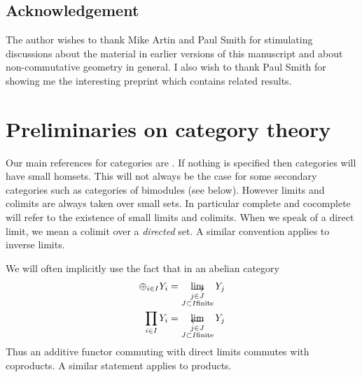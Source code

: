 \documentclass{amsproc}
\let\oldtext\text
\def\text#1{\oldtext{\upshape #1}}
\let\invlim\projlim
\theoremstyle{definition}
\theoremstyle{remark}
\def\dirlim{\mathop{\vtop{\baselineskip -100pt\lineskip -1pt\lineskiplimit 0pt
\setbox0\hbox{\upshape lim}\copy0\hbox to \wd0{\rightarrowfill}}}\limits}
\def\invlim{\mathop{\vtop{\baselineskip -100pt\lineskip -1pt\lineskiplimit 0pt
\setbox0\hbox{\upshape lim}\copy0\hbox to \wd0{\leftarrowfill}}}\limits}
\numberwithin{equation}{section}
\numberwithin{table}{section}
\numberwithin{figure}{section}
\begin{document}
\subsection{Acknowledgement}
The author wishes to thank Mike Artin and Paul Smith for stimulating
discussions about the material in earlier versions of this manuscript
and about non-commutative geometry in general. I also wish to thank Paul
Smith for showing me the interesting preprint \cite{SmithZhang} which
contains related results.
\section{Preliminaries on category theory}
Our main references for categories are \cite{Gabriel,Groth1,ML,stenstrom}.
If nothing is specified then  categories will have small homsets.
This will not always be the case for some secondary categories such as
 categories of bimodules (see below). However limits and colimits are
always taken over small sets. In particular complete and cocomplete
will refer to the existence of small limits and colimits. 
When we speak of a direct limit, we mean a  colimit over a \emph{directed}
set. A similar convention applies to inverse limits.

We will often implicitly use the fact that in an abelian category 
\begin{equation}
\label{ref:2.1a}
\begin{split}
\oplus_{i\in I} Y_i&=\dirlim_{\substack{j\in J\\ J\subset I\text{
      finite}}} Y_j\\
\prod_{i\in I} Y_i&=\invlim_{\substack{j\in J\\ J\subset I\text{
      finite}}} Y_j
\end{split}
\end{equation}
Thus an additive functor commuting with direct limits
 commutes with coproducts. A similar statement applies to products.
 
\end{document}
